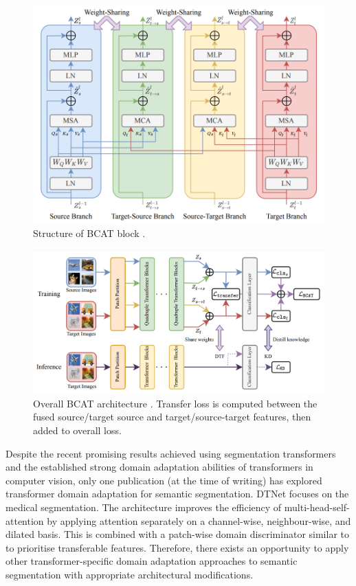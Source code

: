 \documentclass[a4paper,12pt]{report}
\begin{document}
    \begin{figure}
        \centering
        \includegraphics[width=\textwidth]{res/bcat-block.png}
        \caption{Structure of BCAT block \cite{wang_domain_2022}.}
        \label{fig:bcat_block}
    \end{figure}
    \begin{figure}
        \centering
        \includegraphics[width=\textwidth]{res/bcat-architecture.png}
        \caption{Overall BCAT architecture \cite{wang_domain_2022}. Transfer loss is computed between the fused source/target source and target/source-target features, then added to overall loss.}
        \label{fig:bcat_architecture}
    \end{figure}

    Despite the recent promising results achieved using segmentation transformers and the established strong domain adaptation abilities of transformers in computer vision, only one publication (at the time of writing) has explored transformer domain adaptation for semantic segmentation. DTNet \cite{li_dispensed_2021} focuses on the medical segmentation. The architecture improves the efficiency of multi-head-self-attention by applying attention separately on a channel-wise, neighbour-wise, and dilated basis. This is combined with a patch-wise domain discriminator similar to \cite{yang_tvt_2021} to prioritise transferable features. Therefore, there exists an opportunity to apply other transformer-specific domain adaptation approaches \cite{yang_tvt_2021} \cite{xu_cdtrans_2021} \cite{wang_domain_2022} to semantic segmentation with appropriate architectural modifications.



\end{document}
